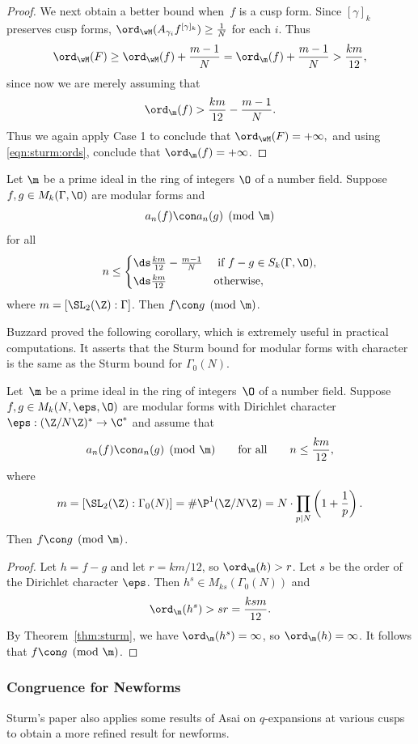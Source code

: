 \begin{proof}
We next obtain a better bound when~$f$ is a cusp form.
Since $[\gamma]_k$ preserves
cusp forms, $\ord_{\wM}(A_{\gamma_i} f^{[\gamma]_k}) \geq \frac{1}{N}$
for each $i$.
Thus
$$
 \ord_{\wM}(F) \geq \ord_{\wM}(f)  + \frac{m-1}{N} = \ord_{\m}(f) + \frac{m-1}{N} > \frac{km}{12},
$$
since now we are merely assuming that 
$$
  \ord_{\m}(f) > \frac{km}{12} 
     - \frac{m - 1}{N}.
$$
Thus we again apply Case 1 to conclude that
$
 \ord_{\wM}(F) = +\infty,
$
and using \eqref{eqn:sturm:ords}, conclude that
$\ord_\m(f)=+\infty$.
\end{proof}

\begin{corollary}
  Let $\m$ be a prime ideal in the ring of integers $\O$ of a
  number field.  Suppose $f,g\in M_k(\Gamma,\O)$ are modular
  forms and 
$$
  a_n(f) \con  a_n(g) \pmod{\m}
$$
for all 
$$
  n\leq 
\begin{cases}
\ds\frac{km}{12} - \frac{m-1}{N} & \text{ if }f-g \in S_k(\Gamma,\O),\vspace{2pt}\\
\ds\frac{km}{12} & \text{otherwise},
\end{cases}
$$
where $m=[\SL_2(\Z):\Gamma]$.
Then $f\con g\pmod{\m}$.
\end{corollary}

Buzzard proved the following corollary, which is extremely useful
in practical computations.
It asserts that the Sturm bound for modular forms with character
is the same as the Sturm bound for $\Gamma_0(N)$.
\begin{corollary}[Buzzard]
  Let~$\m$ be a prime ideal in the ring of integers~$\O$ of a
  number field.  
  Suppose $f,g\in M_k(N,\eps,\O)$ are modular
  forms with Dirichlet character~$\eps:(\Z/N\Z)^* \to \C^*$ and assume
that
  $$
  a_n(f) \con  a_n(g) \pmod{\m}
\qquad\text{for all}\qquad
  n \leq  \frac{km}{12},
$$
where 
$$m=[\SL_2(\Z):\Gamma_0(N)] = 
   \#\P^1(\Z/N\Z) = N \cdot \prod_{p|N}\left(1+\frac{1}{p}\right).$$
Then $f\con g\pmod{\m}$.
\end{corollary}
\begin{proof}
Let $h=f-g$ and 
let $r=km/12$,
so $\ord_\m(h) > r$.  Let $s$ be the order of the
Dirichlet character $\eps$.  Then $h^s \in M_{ks}(\Gamma_0(N))$ 
and 
$$
\ord_\m(h^s) > sr = \frac{ksm}{12}.
$$
By Theorem~\ref{thm:sturm}, we have $\ord_\m(h^s) = \infty$,
so $\ord_\m(h) = \infty$.  It follows that $f\con g\pmod{\m}$.
\end{proof}

\subsubsection{Congruence for Newforms}
Sturm's paper \cite{sturm:cong} also applies some results of Asai on
$q$-expansions at various cusps to obtain a more refined result for
newforms.  

